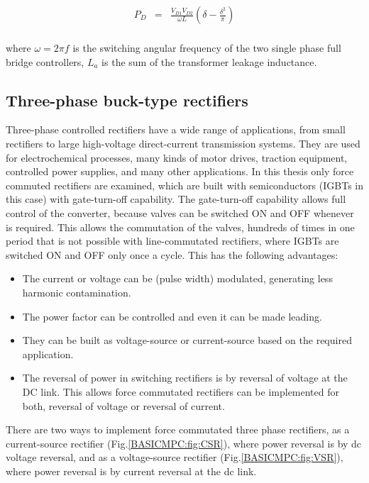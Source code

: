 \begin{equation}
        \begin{array}{rcl}
            P_D&=&\frac{V_{D1}V_{D2}}{\omega L}\left(\delta-\frac{\delta^2}{\pi}\right)\\
        \end{array}
        \label{BASICMPC:equ:DCDC}
    \end{equation}
		
		where $\omega=2\pi f$ is the switching angular frequency of the two single phase full bridge controllers, $L_a$ is the
sum of the transformer leakage inductance. 

\subsection{Three-phase buck-type rectifiers}\label{BASICCSR:sec:CSR}

Three-phase controlled rectifiers have a wide range of applications, from small rectifiers to large high-voltage direct-current
transmission systems. They are used for electrochemical processes, many kinds of motor drives, traction equipment, controlled power supplies, and many other applications. In this thesis only force commuted rectifiers are examined, which are built with semiconductors (IGBTs in this case) with gate-turn-off capability. The gate-turn-off capability allows full control of the converter, because valves can be switched ON and OFF whenever is required. This allows the commutation of the valves, hundreds of times in one period that is not possible with line-commutated rectifiers, where IGBTs are switched ON and OFF only once a cycle. This has the following advantages:

\begin{itemize}
\item The current or voltage can be (pulse width) modulated, generating less harmonic contamination.
\item The power factor can be controlled and even it can be made leading.
\item They can be built as voltage-source or current-source based on the required application.
\item The reversal of power in switching rectifiers is by reversal of voltage at the DC link. This allows force commutated rectifiers can be implemented for both, reversal of voltage or reversal of current.
\end{itemize}

There are two ways to implement force commutated three phase rectifiers, as a current-source rectifier (Fig.\ref{BASICMPC:fig:CSR}), where power reversal is by dc voltage reversal, and as a voltage-source rectifier (Fig.\ref{BASICMPC:fig:VSR}), where power reversal is by current reversal at the dc link.


